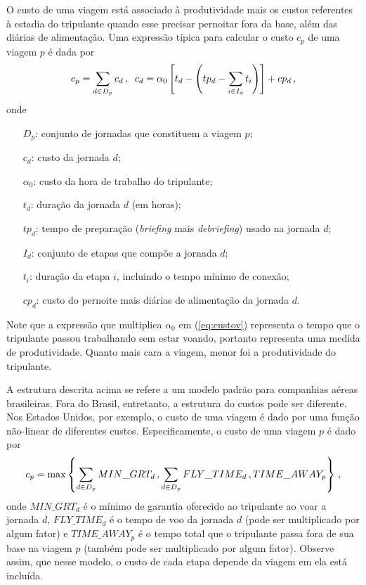 O custo de uma viagem está associado à produtividade mais os custos referentes à estadia do 
tripulante quando esse precisar pernoitar fora da base, além das diárias de alimentação. Uma 
expressão típica para calcular o custo $c_p$ de uma viagem $p$ é dada por
%
\begin{equation} \label{eq:custov} 
	c_p = \sum_{d \in D_p} c_d \, , \;\;
	c_d = \alpha_0 \left[t_d - \left(tp_d - \sum_{i \in I_d} t_i\right)\right] + cp_d \, ,
\end{equation} 
%
onde
%
\begin{itemize}
	\item[$D_p$:] conjunto de jornadas que constituem a viagem $p$;
	\item[$c_d$:] custo da jornada $d$;
	\item[$\alpha_0$:] custo da hora de trabalho do tripulante;
	\item[$t_d$:] duração da jornada $d$ (em horas);	
	\item[$tp_d$:] tempo de preparação ({\it briefing} mais {\it debriefing}) usado na jornada $d$;
	\item[$I_d$:] conjunto de etapas que compõe a jornada $d$;
	\item[$t_i$:] duração da etapa $i$, incluindo o tempo mínimo de conexão;
	\item[$cp_d$:] custo do pernoite mais diárias de alimentação da jornada $d$.
\end{itemize}
%
Note que a expressão que multiplica $\alpha_0$ em (\ref{eq:custov}) representa o tempo que o
tripulante passou trabalhando sem estar voando, portanto representa uma medida de produtividade.
Quanto mais cara a viagem, menor foi a produtividade do tripulante.

A estrutura descrita acima se refere a um modelo padrão para companhias aéreas brasileiras.
Fora do Brasil, entretanto, a estrutura do custos pode ser diferente. Nos Estados Unidos, por 
exemplo, o custo de uma viagem é dado por uma função não-linear de diferentes custos. 
Especificamente, o custo de uma viagem $p$ é dado por
%
\begin{equation*}
	c_p = \max\left\{\sum_{d \in D_p} MIN\_GRT_d \, , \sum_{d \in D_p} FLY\_TIME_d \, , 
	TIME\_AWAY_p \right\} \, ,
\end{equation*}
%
onde $MIN\_GRT_d$ é o mínimo de garantia oferecido ao tripulante ao voar a jornada $d$, 
$FLY\_TIME_d$ é o tempo de voo da jornada $d$ (pode ser multiplicado por algum fator) e
$TIME\_AWAY_p$ é o tempo total que o tripulante passa fora de sua base na viagem $p$ (também pode
ser multiplicado por algum fator). Observe assim, que nesse modelo, o custo de cada etapa depende da
viagem em ela está incluída.


